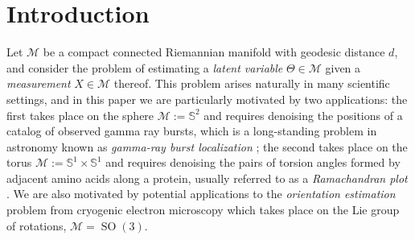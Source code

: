 \documentclass[preprint]{imsart}
\theoremstyle{plain}
\theoremstyle{definition}
\newcommand{\Mcal}{\mathcal{M}}
\DeclareMathOperator{\SO}{SO}
\begin{document}
    
\section{Introduction}

    Let $\Mcal$ be a compact connected Riemannian manifold with geodesic distance $d$, and consider the problem of estimating a \textit{latent variable} $\Theta\in\Mcal$ given a \textit{measurement} $X\in\Mcal$ thereof. This problem arises naturally in many scientific settings, and in this paper we are particularly motivated by two applications:
    the first takes place on the sphere $\Mcal:=\mathbb{S}^2$ and requires denoising the positions of a catalog of observed gamma ray bursts, which is a long-standing problem in astronomy known as \textit{gamma-ray burst localization} \cite{UlyssesGRB, Connaughton_2015, GRB_errors};
    the second takes place on the torus $\mathcal{M}:=\mathbb{S}^1\times \mathbb{S}^1$ and requires denoising the pairs of torsion angles formed by adjacent amino acids along a protein, usually referred to as a \textit{Ramachandran plot} \cite{Ramachandran,Hollingsworth,Pertsemlidis,Park}.
    We are also motivated by potential applications to the \textit{orientation estimation} problem from cryogenic electron microscopy \cite{Harpaz_Shkolnisky_2023, Mendez, BayesianOrientationCryoEM} which takes place on the Lie group of rotations, $\Mcal=\SO(3)$.
    
\end{document}
